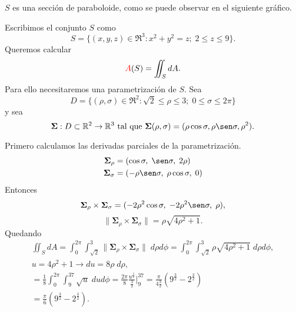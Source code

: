 \begin{solution}
    $S$ es una secci\'on de paraboloide, como se puede observar en el siguiente gr\'afico.

    \begin{center}
    \end{center}

    Escribimos el conjunto $S$ como
    \[
    S=\{(x,y,z)\in \Re^3: x^2+y^2=z;\;2\leq z\leq 9 \}.
    \]
    Queremos calcular \[ \textcolor{red}{A}(S) = \iint_S dA.\]   
    Para ello necesitaremos una parametrizaci\'on de $S$. Sea  $$D=\{(\rho, \sigma) \in\Re^2:    \sqrt{2}\leq \rho \leq 3;\;0\leq  \sigma \leq 2\pi \}$$  y  sea  $$\boldsymbol{\Sigma}:D \subset\Re^2\to\Re^3  \mbox{ tal que }   \boldsymbol{\Sigma}(\rho,\sigma)=(\rho \cos\sigma, \rho \sen\sigma , \rho^{2}).$$ 
  
    Primero calculamos las derivadas parciales de la parametrizaci\'on.
    \begin{align*}
    \boldsymbol{\Sigma}_{\rho}&=(\cos \sigma,\;\sen \sigma,\; 2\rho)\\
    \boldsymbol{\Sigma}_\sigma&=(  -\rho \sen \sigma,\;\rho \cos \sigma,\;0)
    \end{align*}
    Entonces
    $$
    \boldsymbol{\Sigma}_{\rho} \times\boldsymbol{\Sigma}_\sigma = (-2\rho^2 \cos\sigma  , \;-2\rho^2 \sen \sigma, \;\rho),
    $$ 
$$\|  \boldsymbol{\Sigma}_{\rho} \times\boldsymbol{\Sigma}_\sigma \|    = \rho\sqrt{4\rho^2+1}.$$ 
Quedando
       \begin{gather*} 
       \iint_S dA 
       = \int_0^{2\pi} \int_{\sqrt{2}}^3 \|\boldsymbol{\Sigma}_{\rho} \times\boldsymbol{\Sigma}_\sigma \| \; d\rho d\phi
       = \int_0^{2\pi} \int_{\sqrt{2}}^3 \rho\sqrt{4\rho^2+1}\;d\rho d\phi,\\[.2cm]
       u=4\rho^2+1 \rightarrow du = 8\rho\;d\rho, \\[.2cm]
       = \frac{1}{8}\int_0^{2\pi} \int_9^{37} \sqrt{u}\;du d\phi = \frac{2\pi}{8}\frac{u^{\frac{3}{2}}}{\frac{3}{2}}\Bigg|_9^37 = \frac{\pi}{4\frac{3}{2}} (9^{\frac{3}{2}} - 2^{\frac{3}{2}}) \\[.2cm]
       = \frac{\pi}{6} (9^{\frac{3}{2}} - 2^{\frac{3}{2}}).
       \end{gather*}
\end{solution}

